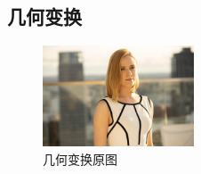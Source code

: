 \documentclass[11pt]{ctexart}
\begin{document}
\newpage

\subsection*{几何变换}


\begin{figure}[htbp]
    \centering
    \includegraphics[width=0.4\textwidth]{input/3.3.jpg}
    \caption{几何变换原图}
\end{figure}
\end{document}
